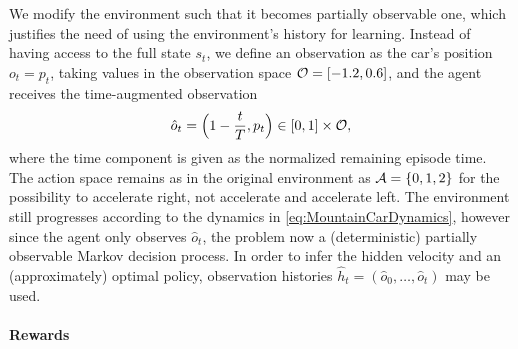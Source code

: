 \documentclass[
    a4paper,
    11pt,
    bibliography=totoc,
    listof=totoc,      
    headinclude=true,
    cleardoublepage=empty,
]{scrbook}
\theoremstyle{plain}
\theoremstyle{definition}
\theoremstyle{remark}
\newcommand{\SpaceA}{{\cal A}}
\newcommand{\SpaceO}{{\cal O}}
\begin{document}
We modify the environment such that it becomes partially observable one, which
justifies the need of using the environment's history for learning. Instead of
having access to the full state $s_t$, we define an observation as the car's
position $o_t = p_t$, taking values in the observation space $\SpaceO = [-1.2,
0.6]$, and the agent receives the time-augmented observation
\[
    \hat{o}_t = \Bigl(1-\frac{t}{T}, p_t\Bigr) 
    \in [0,1]\times\SpaceO,
\]
where the time component is given as the normalized remaining episode time.
The action space remains as in the original environment as $\SpaceA=\{0,1,2\}$
for the possibility to accelerate right, not accelerate and accelerate left.
The environment still progresses according to the dynamics in
\cref{eq:MountainCarDynamics}, however since the agent only observes 
$\hat{o}_t$, the problem now a (deterministic) partially observable Markov
decision process. In order to infer the hidden velocity and  an
(approximately) optimal policy, observation histories $\hat{h}_t = (\hat{o}_0, 
\dots, \hat{o}_{t})$ may be used.

\paragraph{Rewards}
\label{chapter:Experiments:section:MountainCar:sub:Environment:par:Reward}
\end{document}
